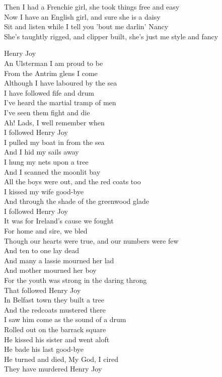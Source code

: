 \documentclass[letterpaper,9pt]{article}
\begin{document}
Then I had a Frenchie girl, she took things free and easy \\
Now I have an English girl, and sure she is a daisy \\

Sit and listen while I tell you 'bout me darlin' Nancy \\
She's taughtly rigged, and clipper built, she's just me style and fancy \\

\newpage
{}
\Huge
Henry Joy\\

\Large
An Ulsterman I am proud to be \\
From the Antrim glens I come \\
Although I have laboured by the sea \\
I have followed fife and drum \\
I've heard the martial tramp of men \\
I've seen them fight and die \\
Ah! Lads, I well remember when \\
I followed Henry Joy \\

I pulled my boat in from the sea \\
And I hid my sails away \\
I hung my nets upon a tree \\
And I scanned the moonlit bay \\
All the boys were out, and the red coats too \\
I kissed my wife good-bye \\
And through the shade of the greenwood glade \\
I followed Henry Joy \\

It was for Ireland's cause we fought \\
For home and sire, we bled \\
Though our hearts were true, and our numbers were few \\
And ten to one lay dead \\
And many a lassie mourned her lad \\
And mother mourned her boy \\
For the youth was strong in the daring throng \\
That followed Henry Joy \\

In Belfast town they built a tree \\
And the redcoats mustered there \\
I saw him come as the sound of a drum \\
Rolled out on the barrack square \\
He kissed his sister and went aloft \\
He bade his last good-bye \\
He turned and died, My God, I cired \\
They have murdered Henry Joy \\
\end{document}
